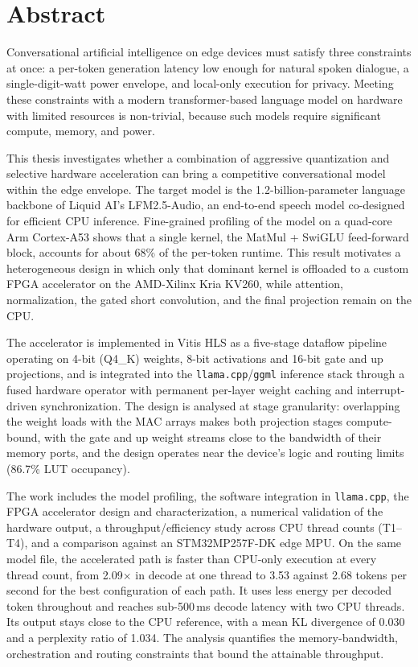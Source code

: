 \chapter*{Abstract} %
\label{sommario}


Conversational artificial intelligence on edge devices must satisfy three
constraints at once: a per-token generation latency low enough for natural
spoken dialogue, a single-digit-watt power envelope, and local-only execution
for privacy. Meeting these constraints with a modern transformer-based language
model on hardware with limited resources is non-trivial, because such models require significant compute, memory, and power.


This thesis investigates whether a combination of aggressive quantization and
selective hardware acceleration can bring a competitive conversational model
within the edge envelope. The target model is the 1.2-billion-parameter language
backbone of Liquid AI's LFM2.5-Audio, an end-to-end speech model co-designed for
efficient CPU inference. Fine-grained profiling of the model on a quad-core
Arm Cortex-A53 shows that a single kernel, the MatMul + SwiGLU feed-forward
block, accounts for about 68\% of the per-token runtime. This result motivates a
heterogeneous design in which only that dominant kernel is offloaded to a custom
FPGA accelerator on the AMD-Xilinx Kria KV260, while attention, normalization,
the gated short convolution, and the final projection remain on the CPU.

The accelerator is implemented in Vitis HLS as a five-stage dataflow pipeline
operating on 4-bit (Q4\_K) weights, 8-bit activations and 16-bit gate and up
projections, and is integrated into the \texttt{llama.cpp}/\texttt{ggml} inference
stack through a fused hardware operator with permanent per-layer weight caching
and interrupt-driven synchronization. The design is analysed at stage
granularity: overlapping the weight loads with the MAC arrays makes both
projection stages compute-bound, with the gate and up weight streams close to the
bandwidth of their memory ports, and the design operates near the device's logic and
routing limits (86.7\% LUT occupancy).

The work includes the model profiling, the
software integration in \texttt{llama.cpp}, the FPGA accelerator design and
characterization, a numerical validation of the hardware output, a
throughput/efficiency study across CPU thread counts (T1--T4), and a comparison
against an STM32MP257F-DK edge MPU. On the same model file, the accelerated path
is faster than CPU-only execution at every thread count, from 2.09$\times$ in
decode at one thread to 3.53 against 2.68 tokens per second for the best
configuration of each path. It uses less energy per decoded token throughout
and reaches sub-500\,ms decode latency with two CPU threads. Its output stays
close to the CPU reference, with a mean KL divergence of 0.030 and a perplexity
ratio of 1.034. The analysis quantifies the memory-bandwidth, orchestration and
routing constraints that bound the attainable throughput.
